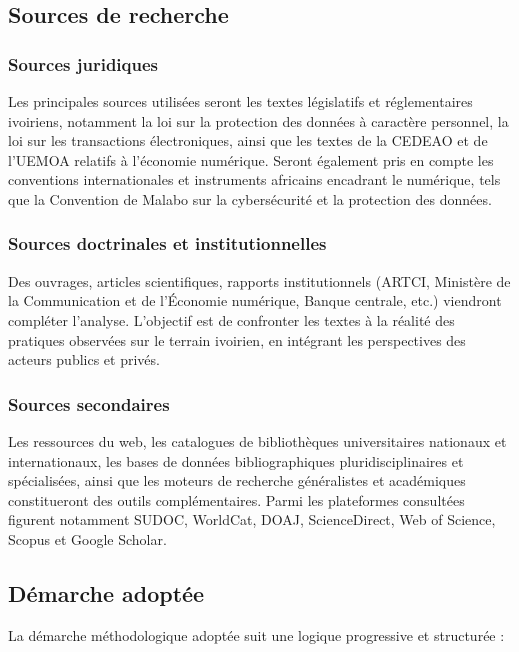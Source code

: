 \subsection*{Sources de recherche}

\subsubsection*{Sources juridiques}

Les principales sources utilisées seront les textes législatifs et réglementaires ivoiriens, notamment la loi sur la protection des données à caractère personnel, la loi sur les transactions électroniques, ainsi que les textes de la CEDEAO et de l'UEMOA relatifs à l'économie numérique. Seront également pris en compte les conventions internationales et instruments africains encadrant le numérique, tels que la Convention de Malabo sur la cybersécurité et la protection des données.

\subsubsection*{Sources doctrinales et institutionnelles}

Des ouvrages, articles scientifiques, rapports institutionnels (ARTCI, Ministère de la Communication et de l'Économie numérique, Banque centrale, etc.) viendront compléter l'analyse. L'objectif est de confronter les textes à la réalité des pratiques observées sur le terrain ivoirien, en intégrant les perspectives des acteurs publics et privés.

\subsubsection*{Sources secondaires}

Les ressources du web, les catalogues de bibliothèques universitaires nationaux et internationaux, les bases de données bibliographiques pluridisciplinaires et spécialisées, ainsi que les moteurs de recherche généralistes et académiques constitueront des outils complémentaires. Parmi les plateformes consultées figurent notamment SUDOC, WorldCat, DOAJ, ScienceDirect, Web of Science, Scopus et Google Scholar.

\subsection*{Démarche adoptée}

La démarche méthodologique adoptée suit une logique progressive et structurée :

